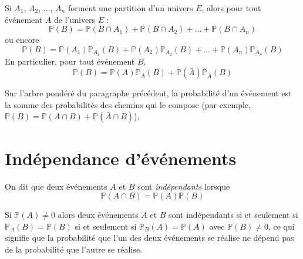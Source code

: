 \documentclass[french]{book}
\begin{document}


\begin{thm}
 Si $A_1$, $A_2$, ..., $A_n$ forment une partition d'un univers $E$, alors pour tout événement $A$ de l'univers $E$ :
$$\mathbb{P}(B)=\mathbb{P}(B\cap A_1)+\mathbb{P}(B\cap A_2)+...+\mathbb{P}(B\cap A_n)$$
ou encore
$$\mathbb{P}(B)=\mathbb{P}(A_1)\mathbb{P}_{A_1}(B)+\mathbb{P}(A_2)\mathbb{P}_{A_2}(B)+...+\mathbb{P}(A_n)\mathbb{P}_{A_n}(B)$$
En particulier, pour tout événement $B$,
$$\mathbb{P}(B)=\mathbb{P}(A)\mathbb{P}_{A}(B)+\mathbb{P}(\bar{A})\mathbb{P}_{\bar{A}}(B)$$
\end{thm}

\begin{defn}
Sur l'arbre pondéré du paragraphe précédent, la probabilité d'un événement est la somme des probabilités des chemins qui le compose (par exemple, $\mathbb{P}(B)=\mathbb{P}(A\cap B)+\mathbb{P}(\bar{A}\cap B)$).
\end{defn}



\section{Indépendance d'événements}

\begin{defn}
On dit que deux événements $A$ et $B$ sont \emph{indépendants} lorsque $$\mathbb{P}(A\cap B)=\mathbb{P}(A)\mathbb{P}(B)$$
\end{defn}
\begin{rem}
Si $\mathbb{P}(A)\neq 0$ alors deux événements $A$ et $B$ sont indépendants si et seulement si $\mathbb{P}_A(B)=\mathbb{P}(B)$ si et seulement si $\mathbb{P}_B(A)=\mathbb{P}(A)$ avec $\mathbb{P}(B)\neq 0$, ce qui signifie que la probabilité que l'un des deux événements se réalise ne dépend pas de la probabilité que l'autre se réalise.
\end{rem} 
\end{document}
